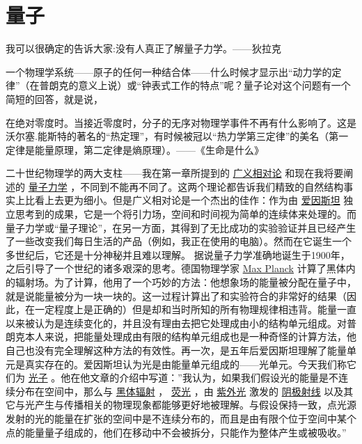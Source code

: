 	\chapter{量子}
\indent

我可以很确定的告诉大家:没有人真正了解量子力学。——狄拉克

一个物理学系统——原子的任何一种结合体——什么时候才显示出“动力学的定律”（在普朗克的意义上说）或“钟表式工作的特点”呢？量子论对这个问题有一个简短的回答，就是说，

在绝对零度时。当接近零度时，分子的无序对物理学事件不再有什么影响了。这是沃尔塞.能斯特的著名的“热定理”，有时候被冠以“热力学第三定律”的美名（第一定律是能量原理，第二定律是熵原理）。——《生命是什么》



    二十世纪物理学的两大支柱——我在第一章所提到的
\href{http://toyhouse.cc/wiki/index.php/广义相对论}{广义相对论}
和现在我将要阐述的
\href{http://toyhouse.cc/wiki/index.php/量子力学}{量子力学}
，不同到不能再不同了。这两个理论都告诉我们精致的自然结构事实上比看上去更为细小。但是广义相对论是一个杰出的佳作：作为由
\href{http://toyhouse.cc/wiki/index.php/爱因斯坦}{爱因斯坦}
独立思考到的成果，它是一个将引力场，空间和时间视为简单的连续体来处理的。而量子力学或“量子理论”，在另一方面，其得到了无比成功的实验验证并且已经产生了一些改变我们每日生活的产品（例如，我正在使用的电脑）。然而在它诞生一个多世纪后，它还是十分神秘并且难以理解。
    据说量子力学准确地诞生于1900年，之后引导了一个世纪的诸多艰深的思考。德国物理学家
\href{https://en.wikipedia.org/wiki/马克思·普朗克}{Max Planck}
计算了黑体内的辐射场。为了计算，他用了一个巧妙的方法：他想象场的能量被分配在量子中，就是说能量被分为一块一块的。这一过程计算出了和实验符合的非常好的结果（因此，在一定程度上是正确的）但是却和当时所知的所有物理规律相违背。能量一直以来被认为是连续变化的，并且没有理由去把它处理成由小的结构单元组成。对普朗克本人来说，把能量处理成由有限的结构单元组成也是一种奇怪的计算方法，他自己也没有完全理解这种方法的有效性。再一次，是五年后爱因斯坦理解了能量单元是真实存在的。爱因斯坦认为光是由能量单元组成的——光单元。今天我们称它们为
\href{http://toyhouse.cc/wiki/index.php/光子}{光子}
。他在他文章的介绍中写道：''我认为，如果我们假设光的能量是不连续分布在空间中，那么与
\href{http://toyhouse.cc/wiki/index.php/黑体辐射}{黑体辐射}
，
\href{http://toyhouse.cc/wiki/index.php/荧光}{荧光}
，由
\href{http://toyhouse.cc/wiki/index.php/紫外光}{紫外光}
激发的
\href{http://toyhouse.cc/wiki/index.php/阴极射线}{阴极射线}
以及其它与光产生与传播相关的物理现象都能够更好地被理解。与假设保持一致，点光源发射的光的能量在扩张的空间中是不连续分布的，而且是由有限个位于空间中某个点的能量量子组成的，他们在移动中不会被拆分，只能作为整体产生或被吸收。''
